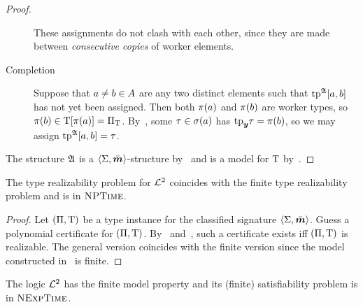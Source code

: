 \begin{proof}
\begin{description}
  These assignments do not clash with each other, since they are made between
  \emph{consecutive copies} of worker elements.
  \item[Completion]
  Suppose that $a\neq b \in A$ are any two distinct elements such that
  $\operatorname{tp}^{\mathfrak{A}}[a,b]$ has not yet been assigned. 
  Then both $\pi(a)$ and $\pi(b)$ are worker types, so $\pi(b) \in
  \mathrm{T}[\pi(a)] = {\Pi}_{\mathrm{T}}$.
  By~, some $\tau\in\sigma(a)$ has $\mathrm{tp}_{\bm{y}}\tau = \pi(b)$, so we
  may assign $\operatorname{tp}^{\mathfrak{A}}[a,b] = \tau$.
\end{description}
The structure $\mathfrak{A}$ is a $\left\langle \mathrm{\Sigma},\bar{\bm{m}} \right\rangle$-structure by~ and is
a model for $\mathrm{T}$ by~.
\end{proof}

\begin{proposition}\label{prop:tprealiz-1}
The type realizability problem for $\mathcal{L}^{2}$ coincides with the finite type
realizability problem and is in $\text{\normalfont{\scshape NPTime}}$.
\end{proposition}
\begin{proof}
Let $(\Pi,\mathrm{T})$ be a type instance for the classified signature
$\left\langle \mathrm{\Sigma},\bar{\bm{m}} \right\rangle$. Guess a polynomial certificate for $(\Pi,\mathrm{T})$.
By~ and~, such a certificate exists
iff $(\Pi,\mathrm{T})$ is realizable.
The general version coincides with the finite version since the model
constructed in~ is finite.
\end{proof}
\begin{corollary}
The logic $\mathcal{L}^{2}$ has the finite model property and its (finite) satisfiability
problem is in $\text{\normalfont{\scshape NExpTime}}$.
\end{corollary}